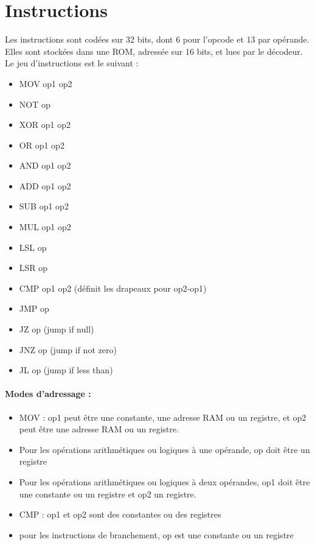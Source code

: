 \documentclass{article}
\begin{document}
    \section{Instructions}
    Les instructions sont codées sur 32 bits, dont 6 pour l'opcode et 13 par opérande. Elles sont stockées dans une
    ROM, adressée sur 16 bits, et lues par le décodeur. Le jeu d'instructions est le suivant :
    \begin{multicols}{2}
        \begin{itemize}
            \item MOV op1 op2
            \item NOT op
            \item XOR op1 op2
            \item OR op1 op2
            \item AND op1 op2
            \item ADD op1 op2
            \item SUB op1 op2
            \item MUL op1 op2
            \item LSL op
            \item LSR op
            \item CMP op1 op2 (définit les drapeaux pour op2-op1)
            \item JMP op
            \item JZ op (jump if null)
            \item JNZ op (jump if not zero)
						\item JL op (jump if less than)
        \end{itemize}
    \end{multicols}
    \paragraph{Modes d'adressage :}
    \begin{itemize}
        \item MOV : op1 peut être une constante, une adresse RAM
ou un registre, et op2 peut être une adresse RAM ou un registre.
        \item Pour les opérations arithmétiques ou logiques à une opérande, op doit être un registre
        \item Pour les opérations arithmétiques ou logiques à deux opérandes, op1 doit être une constante ou un registre
et op2 un registre.
        \item CMP : op1 et op2 sont des constantes ou des registres
        \item pour les instructions de branchement, op est une constante ou un registre
    \end{itemize}
\end{document}
